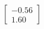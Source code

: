 \documentclass[preview]{standalone}
\begin{document}
\begin{align*}
\begin{bmatrix} -0.56 \\ 1.60 \end{bmatrix}
\end{align*}
\end{document}
